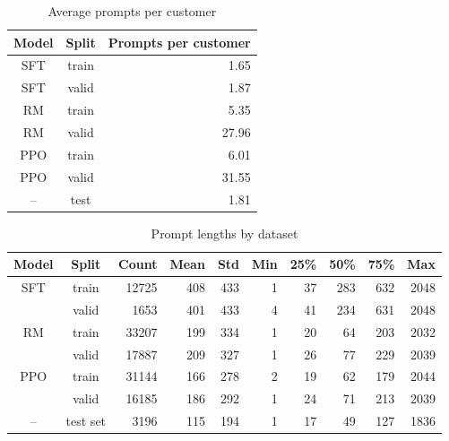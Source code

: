 \documentclass{article}
\begin{document}
\begin{table}[hp]
    \centering
    \caption{Average prompts per customer}
    \label{tab:prompts-per-cust}
    \begin{tabular}{ccr}
    \toprule
    Model & Split &  Prompts per customer \\
    \midrule
           SFT & train &                  1.65 \\
           SFT & valid &                  1.87 \\
            RM & train &                  5.35 \\
            RM & valid &                 27.96 \\
           PPO & train &                  6.01 \\
           PPO & valid &                 31.55 \\
            -- & test  &                  1.81 \\
    \bottomrule
    \end{tabular}
\end{table}

\begin{table}[tp]
    \centering
    \caption{Prompt lengths by dataset}
    \label{tab:prompt-length-by-model}
    \begin{tabular}{ccrrrrrrrr}
    \toprule
    Model    &  Split     &            Count & Mean &  Std & Min & 25\% &  50\% &  75\% &   Max \\
    \midrule
    SFT & train &            12725 &  408 &  433 &   1 &  37 &  283 &  632 &  2048 \\
        & valid &             1653 &  401 &  433 &   4 &  41 &  234 &  631 &  2048 \\
    RM & train &            33207 &  199 &  334 &   1 &  20 &   64 &  203 &  2032 \\
        & valid &            17887 &  209 &  327 &   1 &  26 &   77 &  229 &  2039 \\
    PPO & train &            31144 &  166 &  278 &   2 &  19 &   62 &  179 &  2044 \\
        & valid &            16185 &  186 &  292 &   1 &  24 &   71 &  213 &  2039 \\
    -- & test set &             3196 &  115 &  194 &   1 &  17 &   49 &  127 &  1836 \\
    \bottomrule
    \end{tabular}
\end{table}
\end{document}
